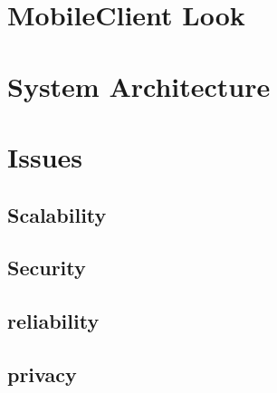 \documentclass[10pt,a4paper]{article}
\begin{document}
\section*{MobileClient Look}
\section*{System Architecture}
\section*{Issues}
\subsection*{Scalability}
\subsection*{Security}
\subsection*{reliability}
\subsection*{privacy}
\end{document}
